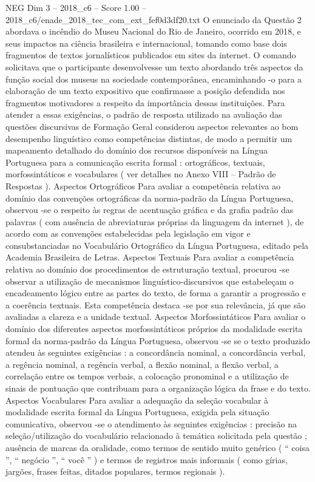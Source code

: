 \begin{textsample}{NEG Dim 3 – 2018\_c6 – Score 1.00 – 2018\_c6/enade\_2018\_tec\_com\_ext\_fef0d3df20.txt}
O enunciado da Questão 2 abordava o incêndio do Museu Nacional do Rio de Janeiro, ocorrido em 2018, e seus impactos na ciência brasileira e internacional, tomando como base dois fragmentos de textos jornalísticos publicados em sites da internet.
O comando solicitava que o participante desenvolvesse um texto abordando três aspectos da função social dos museus na sociedade contemporânea, encaminhando -o para a elaboração de um texto expositivo que confirmasse a posição defendida nos fragmentos motivadores a respeito da importância dessas instituições.
Para atender a essas exigências, o padrão de resposta utilizado na avaliação das questões discursivas de Formação Geral considerou aspectos relevantes ao bom desempenho linguístico como competências distintas, de modo a permitir um mapeamento detalhado do domínio dos recursos disponíveis na Língua Portuguesa para a comunicação escrita formal : ortográficos, textuais, morfossintáticos e vocabulares ( ver detalhes no Anexo VIII – Padrão de Respostas ).
Aspectos Ortográficos Para avaliar a competência relativa ao domínio das convenções ortográficas da norma-padrão da Língua Portuguesa, observou -se o respeito às regras de acentuação gráfica e da grafia padrão das palavras ( com ausência de abreviaturas próprias da linguagem da internet ), de acordo com as convenções estabelecidas pela legislação em vigor e consubstanciadas no Vocabulário Ortográfico da Língua Portuguesa, editado pela Academia Brasileira de Letras.
Aspectos Textuais Para avaliar a competência relativa ao domínio dos procedimentos de estruturação textual, procurou -se observar a utilização de mecanismos linguístico-discursivos que estabeleçam o encadeamento lógico entre as partes do texto, de forma a garantir a progressão e a coerência textuais.
Esta competência destaca -se por sua relevância, já que são avaliadas a clareza e a unidade textual.
Aspectos Morfossintáticos Para avaliar o domínio dos diferentes aspectos morfossintáticos próprios da modalidade escrita formal da norma-padrão da Língua Portuguesa, observou -se se o texto produzido atendeu às seguintes exigências : a concordância nominal, a concordância verbal, a regência nominal, a regência verbal, a flexão nominal, a flexão verbal, a correlação entre os tempos verbais, a colocação pronominal e a utilização de sinais de pontuação que contribuam para a organização lógica da frase e do texto.
Aspectos Vocabulares Para avaliar a adequação da seleção vocabular à modalidade escrita formal da Língua Portuguesa, exigida pela situação comunicativa, observou -se o atendimento às seguintes exigências : precisão na seleção/utilização do vocabulário relacionado à temática solicitada pela questão ; ausência de marcas da oralidade, como termos de sentido muito genérico ( “ coisa ”, “ negócio ”, “ você ” ) e termos de registros mais informais ( como gírias, jargões, frases feitas, ditados populares, termos regionais ).

\end{textsample}
